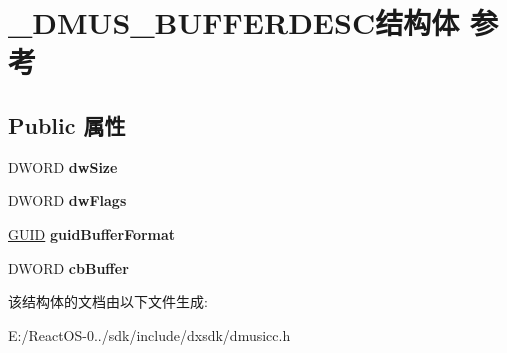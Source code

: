 \hypertarget{struct___d_m_u_s___b_u_f_f_e_r_d_e_s_c}{}\section{\+\_\+\+D\+M\+U\+S\+\_\+\+B\+U\+F\+F\+E\+R\+D\+E\+S\+C结构体 参考}
\label{struct___d_m_u_s___b_u_f_f_e_r_d_e_s_c}
\subsection*{Public 属性}
\begin{DoxyCompactItemize}
\item 
\mbox{\label{struct___d_m_u_s___b_u_f_f_e_r_d_e_s_c_af69920b4c62b4866c063d09b6323898a}} 
D\+W\+O\+RD {\bfseries dw\+Size}
\item 
\mbox{\label{struct___d_m_u_s___b_u_f_f_e_r_d_e_s_c_a6e8f2c1f9ddce2631a93cf5235858933}} 
D\+W\+O\+RD {\bfseries dw\+Flags}
\item 
\mbox{\label{struct___d_m_u_s___b_u_f_f_e_r_d_e_s_c_a93ba1c8ff34e5ebcda878fc2498bde87}} 
\hyperlink{interface_g_u_i_d}{G\+U\+ID} {\bfseries guid\+Buffer\+Format}
\item 
\mbox{\label{struct___d_m_u_s___b_u_f_f_e_r_d_e_s_c_a01f5708c4f8f3006975323b4eda5f3ae}} 
D\+W\+O\+RD {\bfseries cb\+Buffer}
\end{DoxyCompactItemize}


该结构体的文档由以下文件生成\+:\begin{DoxyCompactItemize}
\item 
E\+:/\+React\+O\+S-\/0../sdk/include/dxsdk/dmusicc.\+h\end{DoxyCompactItemize}
